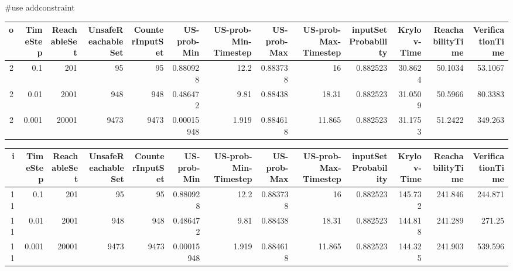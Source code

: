 #use addconstraint
\begin{tabular}{rrrrrrrrrrrrr}
\hline
   o &   TimeStep &   ReachableSet &   UnsafeReachableSet &   CounterInputSet &   US-prob-Min &   US-prob-Min-Timestep &   US-prob-Max &   US-prob-Max-Timestep &   inputSet Probability &   Krylov-Time &   ReachabilityTime &   VerificationTime \\
\hline
   2 &      0.1   &            201 &                   95 &                95 &    0.880928   &                 12.2   &      0.883738 &                 16     &               0.882523 &       30.8624 &            50.1034 &            53.1067 \\
   2 &      0.01  &           2001 &                  948 &               948 &    0.486472   &                  9.81  &      0.88438  &                 18.31  &               0.882523 &       31.0509 &            50.5966 &            80.3383 \\
   2 &      0.001 &          20001 &                 9473 &              9473 &    0.00015948 &                  1.919 &      0.884618 &                 11.865 &               0.882523 &       31.1753 &            51.2422 &           349.263  \\
\hline
\end{tabular}
\begin{tabular}{rrrrrrrrrrrrr}
\hline
   i &   TimeStep &   ReachableSet &   UnsafeReachableSet &   CounterInputSet &   US-prob-Min &   US-prob-Min-Timestep &   US-prob-Max &   US-prob-Max-Timestep &   inputSet Probability &   Krylov-Time &   ReachabilityTime &   VerificationTime \\
\hline
  11 &      0.1   &            201 &                   95 &                95 &    0.880928   &                 12.2   &      0.883738 &                 16     &               0.882523 &       145.732 &            241.846 &            244.871 \\
  11 &      0.01  &           2001 &                  948 &               948 &    0.486472   &                  9.81  &      0.88438  &                 18.31  &               0.882523 &       144.818 &            241.289 &            271.25  \\
  11 &      0.001 &          20001 &                 9473 &              9473 &    0.00015948 &                  1.919 &      0.884618 &                 11.865 &               0.882523 &       144.325 &            241.903 &            539.596 \\
\hline
\end{tabular}


